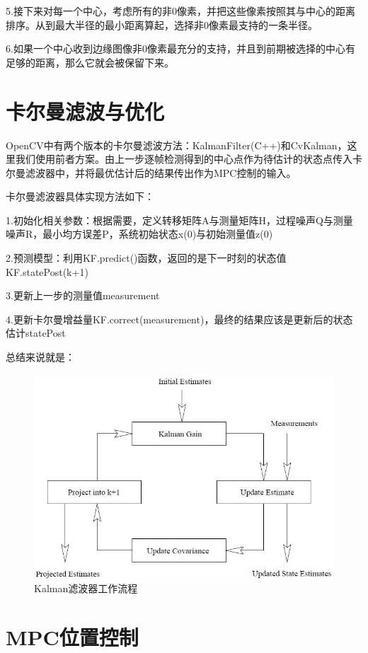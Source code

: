 5.接下来对每⼀个中心，考虑所有的非0像素，并把这些像素按照其与中心的距离排序。从到最大半径的最小距离算起，选择非0像素最支持的⼀条半径\cite{Art6}。

6.如果⼀个中心收到边缘图像⾮0像素最充分的支持，并且到前期被选择的中心有足够的距离，那么它就会被保留下来。

\section{卡尔曼滤波与优化}

OpenCV中有两个版本的卡尔曼滤波方法：KalmanFilter(C++)和CvKalman，这里我们使用前者方案。由上一步逐帧检测得到的中心点作为待估计的状态点传入卡尔曼滤波器中，并将最优估计后的结果传出作为MPC控制的输入。

卡尔曼滤波器具体实现方法如下：

1.初始化相关参数：根据需要，定义转移矩阵A与测量矩阵H，过程噪声Q与测量噪声R，最小均方误差P，系统初始状态x(0)与初始测量值z(0)

2.预测模型：利用KF.predict()函数，返回的是下一时刻的状态值KF.statePost(k+1)

3.更新上一步的测量值measurement

4.更新卡尔曼增益量KF.correct(measurement)，最终的结果应该是更新后的状态估计statePost

总结来说就是：

\begin{figure}[ht]
  \centering
  \includegraphics[width=0.8\linewidth]{./Figure/Kalman_Filter_Code_Process.jpeg}
  \caption{Kalman滤波器工作流程}\label{Fig:img9}
\end{figure}

\section{MPC位置控制}

